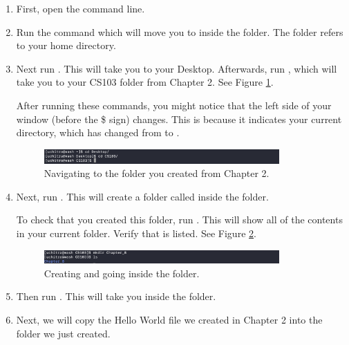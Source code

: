\begin{enumerate}
\item 
First, open the command line. 
\item Run the command  which will move you to inside the \codeblock{$\sim$} folder. The \codeblock{$\sim$}  folder refers to your home directory.
\item
Next run . This will take you to your Desktop. Afterwards, run , which will take you to your CS103 folder from Chapter 2. See Figure \ref{fig:linux:exercise:zero2}.

After running these commands, you might notice that the left side of your window (before the \$ sign) changes. This is because it indicates your current directory, which has changed from  to .

\begin{figure}[ht]
	\centering
	\includegraphics[width=0.85\textwidth]{images/commandLineExercise_zero2}
	\caption{Navigating to the  folder you created from Chapter 2.}
	\label{fig:linux:exercise:zero2}
\end{figure}

\item
Next, run . This will create a folder called  inside the  folder. 

To check that you created this folder, run . This will show all of the contents in your current folder. Verify that  is listed. See Figure \ref{fig:linux:exercise:one2}.

\begin{figure}[ht]
	\centering
	\includegraphics[width=0.85\textwidth]{images/commandLineExercise_one2}
	\caption{Creating and going inside the  folder.}
	\label{fig:linux:exercise:one2}
\end{figure}

\item 
Then run . This will take you inside the  folder.

\item
Next, we will copy the Hello World file we created in Chapter 2 into the  folder we just created.


\end{enumerate}
